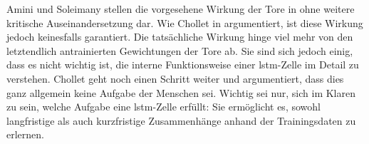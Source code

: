 Amini und Soleimany stellen die vorgesehene Wirkung der Tore in \cite{6S191RNN} ohne weitere kritische Auseinandersetzung dar.
Wie Chollet in \cite[S. 263]{DeepLearningPythonKeras} argumentiert, ist diese Wirkung jedoch keinesfalls garantiert.
Die tatsächliche Wirkung hinge viel mehr von den letztendlich antrainierten Gewichtungen der Tore ab.
Sie sind sich jedoch einig, dass es nicht wichtig ist, die interne Funktionsweise einer \acrshort{lstm}-Zelle im Detail zu verstehen.
Chollet geht noch einen Schritt weiter und argumentiert, dass dies ganz allgemein keine Aufgabe der Menschen sei.
Wichtig sei nur, sich im Klaren zu sein, welche Aufgabe eine \acrshort{lstm}-Zelle erfüllt: Sie ermöglicht es, sowohl langfristige als auch kurzfristige Zusammenhänge anhand der Trainingsdaten zu erlernen.
